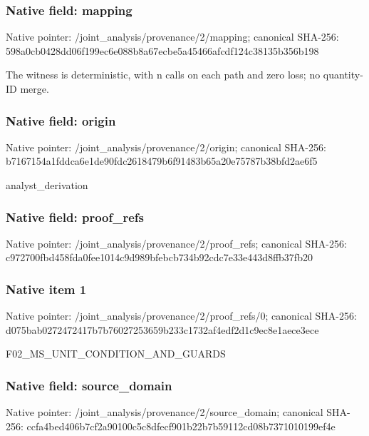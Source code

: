 \documentclass[10pt,a4paper]{article}
\begin{document}
\subsubsection{Native field: mapping}
Native pointer: /joint\_\allowbreak{}analysis/provenance/2/mapping; canonical SHA-256: 598a0cb0428dd06f199ec6e088b8a67ecbe5a45466afcdf124c38135b356b198

\begingroup\raggedright\sloppy The witness is deterministic,\allowbreak{} with n calls on each path and zero loss;\allowbreak{} no quantity-ID merge.\par\endgroup

\subsubsection{Native field: origin}
Native pointer: /joint\_\allowbreak{}analysis/provenance/2/origin; canonical SHA-256: b7167154a1fddca6e1de90fdc2618479b6f91483b65a20e75787b38bfd2ae6f5

\begingroup\raggedright\sloppy analyst\_\allowbreak{}derivation\par\endgroup

\subsubsection{Native field: proof\_\allowbreak{}refs}
Native pointer: /joint\_\allowbreak{}analysis/provenance/2/proof\_\allowbreak{}refs; canonical SHA-256: c972700fbd458fda0fee1014c9d989bfebcb734b92cdc7e33e443d8ffb37fb20

\subsubsection{Native item 1}
Native pointer: /joint\_\allowbreak{}analysis/provenance/2/proof\_\allowbreak{}refs/0; canonical SHA-256: d075bab0272472417b7b76027253659b233c1732af4edf2d1c9ec8e1aece3ece

\begingroup\raggedright\sloppy F02\_\allowbreak{}MS\_\allowbreak{}UNIT\_\allowbreak{}CONDITION\_\allowbreak{}AND\_\allowbreak{}GUARDS\par\endgroup

\subsubsection{Native field: source\_\allowbreak{}domain}
Native pointer: /joint\_\allowbreak{}analysis/provenance/2/source\_\allowbreak{}domain; canonical SHA-256: ccfa4bed406b7cf2a90100c5c8dfecf901b22b7b59112cd08b7371010199ef4e
\end{document}
